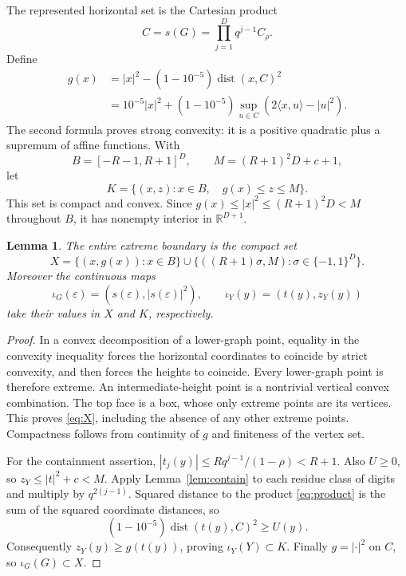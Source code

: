 \documentclass[11pt,letterpaper]{amsart}
\newtheorem{lemma}[theorem]{Lemma}
\theoremstyle{definition}
\theoremstyle{remark}
\numberwithin{equation}{section}
\DeclareMathOperator{\dist}{dist}
\begin{document}
The represented horizontal set is the Cartesian product
\begin{equation}\label{eq:product}
                 C=s(G)=\prod_{j=1}^Dq^{j-1}C_\rho.
\end{equation}
Define
\begin{equation}\label{eq:g}
 \begin{split}
 g(x)&=|x|^2-(1-10^{-5})\dist(x,C)^2\\
 &=10^{-5}|x|^2+(1-10^{-5})
                  \sup_{u\in C}(2\langle x,u\rangle-|u|^2).
 \end{split}
\end{equation}
The second formula proves strong convexity: it is a positive
quadratic plus a supremum of affine functions.
With
\[
 B=[-R-1,R+1]^D,\qquad M=(R+1)^2D+c+1,
\]
let
\begin{equation}\label{eq:K}
              K=\{(x,z):x\in B,\quad g(x)\le z\le M\}.
\end{equation}
This set is compact and convex. Since
\(g(x)\le|x|^2\le(R+1)^2D<M\) throughout \(B\),
it has nonempty interior in \(\mathbb R^{D+1}\).

\begin{lemma}\label{lem:extreme}
The entire extreme boundary is the compact set
\begin{equation}\label{eq:X}
 X=\{(x,g(x)):x\in B\}
           \cup\{((R+1)\sigma,M):\sigma\in\{-1,1\}^D\}.
\end{equation}
Moreover the continuous maps
\[
 \iota_G(\varepsilon)=(s(\varepsilon),|s(\varepsilon)|^2),
 \qquad \iota_Y(y)=(t(y),z_Y(y))
\]
take their values in \(X\) and \(K\), respectively.
\end{lemma}
\begin{proof}
In a convex decomposition of a lower-graph point, equality in
the convexity inequality forces the horizontal coordinates to
coincide by strict convexity, and then forces the heights to
coincide. Every lower-graph point is therefore extreme.
An intermediate-height point is a nontrivial vertical convex
combination. The top face is a box, whose only extreme points
are its vertices. This proves \eqref{eq:X}, including the absence
of any other extreme points. Compactness follows from continuity
of \(g\) and finiteness of the vertex set.

For the containment assertion,
\( |t_j(y)|\le Rq^{j-1}/(1-\rho)<R+1\).
Also \(U\ge0\), so \(z_Y\le|t|^2+c<M\).
Apply Lemma~\ref{lem:contain} to each residue class of digits
and multiply by \(q^{2(j-1)}\). Squared distance to the product
\eqref{eq:product} is the sum of the squared coordinate distances,
so
\[
                 (1-10^{-5})\dist(t(y),C)^2\ge U(y).
\]
Consequently \(z_Y(y)\ge g(t(y))\), proving \(\iota_Y(Y)\subset K\).
Finally \(g=|\cdot|^2\) on \(C\), so \(\iota_G(G)\subset X\).
\end{proof}
\end{document}

